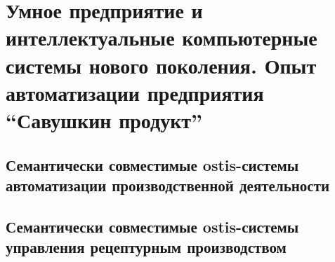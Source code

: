 \chapter{Умное предприятие и интеллектуальные компьютерные системы нового поколения. Опыт автоматизации предприятия ``Савушкин продукт''}
\label{chapter_enterprise}


\section{Семантически совместимые ostis-системы автоматизации производственной деятельности}
\section{Семантически совместимые ostis-системы управления рецептурным производством}

%